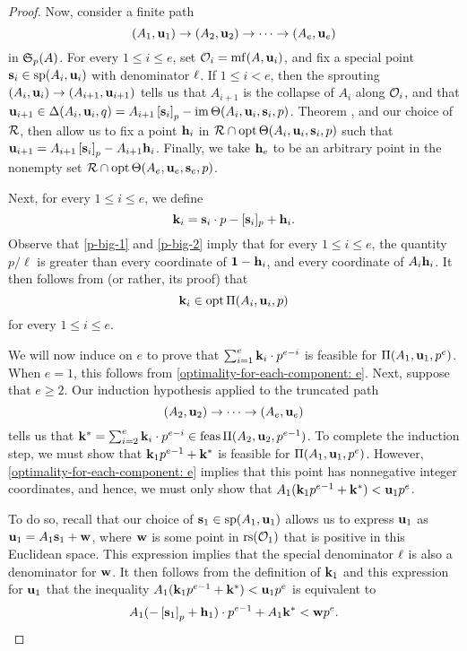 \documentclass[11pt]{amsart}
\begin{document}
\begin{proof}
Now, consider a finite path \[ (A_1, \mathbf{u}_1) \to (A_2, \mathbf{u}_2) \to \cdots \to (A_e, \mathbf{u}_e) \] in $\mathfrak{S}_p(A)$.  For every $1 \leq i \leq e$, set $\mathcal{O}_i = \operatorname{mf}(A, \mathbf{u}_i)$, and fix a special point $\mathbf{s}_i \in \operatorname{sp}(A_i, \mathbf{u}_i)$ with denominator $\ell$.  If $1 \leq i < e$, then the sprouting $(A_i, \mathbf{u}_i) \to (A_{i+1}, \mathbf{u}_{i+1})$ tells us that $A_{i+1}$ is the collapse of $A_i$ along $\mathcal{O}_i$, and that $\mathbf{u}_{i+1} \in \Delta(A_i, \mathbf{u}_i, q) = A_{i+1} \left[ \mathbf{s}_i \right]_p - \operatorname{im}  \Theta( A_i, \mathbf{u}_i, \mathbf{s}_i, p)$.  Theorem , and our choice of $\mathcal{R}$, then allow us to fix a point $\mathbf{h}_i$ in $\mathcal{R} \cap \operatorname{opt} \Theta ( A_i, \mathbf{u}_i, \mathbf{s}_i, p)$ such that
$\mathbf{u}_{i+1} = A_{i+1} \left[ \mathbf{s}_i \right]_p - A_{i+1} \mathbf{h}_i$.  Finally, we take $\mathbf{h}_e$ to be an arbitrary point in the nonempty set $\mathcal{R} \cap \operatorname{opt} \Theta ( A_e, \mathbf{u}_e, \mathbf{s}_e, p)$.


Next, for every $1 \leq i \leq e$,  we define
  \[
\mathbf{k}_i = \mathbf{s}_i \cdot p - [\mathbf{s}_i]_p + \mathbf{h}_i.
\]
Observe that \eqref{p-big-1} and \eqref{p-big-2} imply that for every $1 \leq i \leq e$, the quantity $p/\ell$ is greater than every coordinate of $\mathbf{1}-\mathbf{h}_i$, and every coordinate of $A_i \mathbf{h}_i$.  It then follows from  (or rather, its proof) that
\begin{equation}
\label{optimality-for-each-component: e}
\mathbf{k}_i \in \operatorname{opt} \Pi(A_i, \mathbf{u}_i,p)
\end{equation}
for every $1 \leq i \leq e$.

We will now induce on $e$ to prove that $\sum_{i=1}^e \mathbf{k}_i \cdot p^{e-i}$ is feasible for $\Pi(A_1, \mathbf{u}_1, p^e)$.  When $e = 1$, this follows from \eqref{optimality-for-each-component: e}.  Next, suppose that $e \geq 2$.  Our induction hypothesis applied to the truncated path
\[ (A_2, \mathbf{u}_2) \to \cdots \to (A_e, \mathbf{u}_e) \]
%
tells us that $\mathbf{k}^{\ast} = \sum_{i=2}^e \mathbf{k}_i \cdot p^{e-i} \in \operatorname{feas} \Pi(A_2, \mathbf{u}_2, p^{e-1})$.  To complete the induction step, we must show that $\mathbf{k}_1 p^{e-1} + \mathbf{k}^{\ast}$ is feasible for $\Pi(A_1, \mathbf{u}_1, p^e)$.  However,  \eqref{optimality-for-each-component: e} implies that this point has nonnegative integer coordinates, and hence, we must only show that $A_1 ( \mathbf{k}_1 p^{e-1} + \mathbf{k}^{\ast} ) < \mathbf{u}_1 p^e$.

To do so,  recall that our choice of $\mathbf{s}_1 \in \operatorname{sp}(A_1, \mathbf{u}_1)$ allows us to express $\mathbf{u}_1$ as
$\mathbf{u}_1 = A_1 \mathbf{s}_1 + \mathbf{w}$, where $\mathbf{w}$ is some point in $\operatorname{rs}(\mathcal{O}_1)$ that is positive in this Euclidean space.  This expression implies that the special denominator $\ell$ is also a denominator for $\mathbf{w}$.  It then follows from the definition of $\mathbf{k}_1$ and this expression for $\mathbf{u}_1$ that the inequality $A_1 ( \mathbf{k}_1 p^{e-1} + \mathbf{k}^{\ast} ) < \mathbf{u}_1 p^e$ is equivalent to
%
\begin{equation}
\label{target-inequality: e}
  A_1( - \left[ \mathbf{s}_1 \right]_p + \mathbf{h}_1 ) \cdot p^{e-1} + A_1\mathbf{k}^{\ast} < \mathbf{w} p^e.
\end{equation}


\end{proof}
\end{document}
